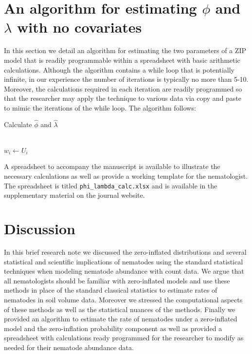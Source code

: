 \documentclass{article}
\begin{document}
\section{An algorithm for estimating $\phi$ and $\lambda$ with no covariates}

In this section we detail an algorithm for estimating the two parameters of a ZIP model that is readily programmable within a spreadsheet with basic arithmetic calculations. Although the algorithm contains a while loop that is potentially infinite, in our experience the number of iterations is typically no more than 5-10. Moreover, the calculations required in each iteration are readily programmed so that the researcher may apply the technique to various data via copy and paste to mimic the iterations of the while loop. The algorithm follows: 

\begin{algorithm}
\caption{Calculate $\hat{\phi}$ and $\hat{\lambda}$}
\label{EM_algo}
\begin{algorithmic}[1]
\\
	\State $w_i \gets U_i$
\EndFor
\end{algorithmic}
\end{algorithm}

A spreadsheet to accompany the manuscript is available to illustrate the necessary calculations as well as provide a working template for the nematologist. The spreadsheet is titled \texttt{phi\_lambda\_calc.xlsx} and is available in the supplementary material on the journal website. 

\section{Discussion}
In this brief research note we discussed the zero-inflated distributions and several statistical and scientific implications of nematodes using the standard statistical techniques when modeling nematode abundance with count data. We argue that all nematologists should be familiar with zero-inflated models and use these methods in place of the standard classical statistics to estimate rates of nematodes in soil volume data. Moreover we stressed the computational aspects of these methods as well as the statistical nuances of the methods. Finally we provided an algorithm to estimate the rate of nematodes under a zero-inflated model and the zero-inflation probability component as well as provided a spreadsheet with calculations ready programmed for the researcher to modify as needed for their nematode abundance data. 
\end{document}
